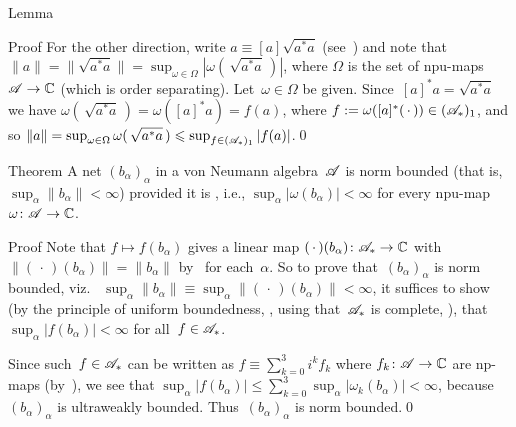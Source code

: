 \documentclass[a]{subfiles}
\begin{document}
\begin{parsec}
\begin{point}{Lemma}
\begin{point}{Proof}
For the other direction,
write $a\equiv [a] \sqrt{a^*a}$ (see~)
and note that $\|a\|=\|\sqrt{a^*a}\|=\sup_{\omega\in \Omega} 
\left|\omega (\,\sqrt{a^*a}\,)\right|$,
where $\Omega$ is the set of  npu-maps $\mathscr{A}\to \mathbb{C}$
(which is order separating).
Let~$\omega\in \Omega$ be given.
Since~$[a]^*a=\sqrt{a^*a}$ 
we have $\omega(\,\sqrt{a^*a}\,)=\omega([a]^*a)=f(a)$,
where $f:=\omega([a]^*(\,\cdot\,))\in (\mathscr{A}_*)_1$,
and so $\|a\|=\sup_{\omega\in\Omega} 
\omega(\,\sqrt{a^*a}\,) \leqslant \sup_{f\in (\mathscr{A}_*)_1}
\left|f(a)\right|$.\qed
\end{point}
\end{point}
\begin{point}{Theorem}%
A net  $(b_\alpha)_\alpha$
 in a von Neumann algebra~$\mathscr{A}$
is norm bounded
(that is,~$\sup_\alpha \|b_\alpha\|<\infty$)
provided it is , i.e.,
$\sup_\alpha \left|\omega(b_\alpha)\right|<\infty$
for every npu-map $\omega\colon \mathscr{A}\to \mathbb{C}$.
\begin{point}{Proof}%
Note that $f\mapsto f(b_\alpha)$
gives a linear map $(\,\cdot\,)(b_\alpha)\colon \mathscr{A}_*\to\mathbb{C}$
with $\|(\,\cdot\,)(b_\alpha)\|=\|b_\alpha\|$ 
by~
for each~$\alpha$.
So to prove that~$(b_\alpha)_\alpha$
is norm bounded, viz.~%
$\sup_\alpha \|b_\alpha\|\equiv \sup_\alpha \|(\,\cdot\,)(b_\alpha)\|<\infty$,
it suffices to show
(by the principle of uniform boundedness, ,
using that~$\mathscr{A}_*$ is complete, ),
that $\sup_\alpha \left|f(b_\alpha)\right|<\infty$ for all~$f\in\mathscr{A}_*$.

Since such~$f\in\mathscr{A}_*$
can be written as $f\equiv \sum_{k=0}^3 i^k f_k$
where $f_k\colon \mathscr{A}\to\mathbb{C}$ are np-maps
(by~),
we see that $\sup_\alpha\left|f(b_\alpha)\right|
\leq \sum_{k=0}^3\sup_\alpha \left|\omega_k(b_\alpha)\right|
<\infty$, because~$(b_\alpha)_\alpha$
is ultraweakly bounded.
Thus~$(b_\alpha)_\alpha$
is norm bounded.\qed
\end{point}
\end{point}
\end{parsec}
\end{document}
